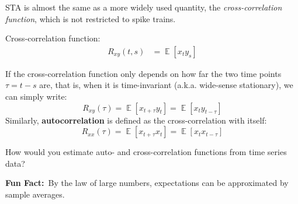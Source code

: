 \documentclass[a4paper,11pt]{exam}
\DeclareMathOperator*{\E}{\mathbb{E}} %
\DeclareMathOperator*{\cov}{cov}
\newcommand{\funfact}{\textbf{Fun Fact:}~}
\begin{document}
\begin{questions}
\newpage
STA is almost the same as a more widely used quantity, the \emph{cross-correlation function}, which is not restricted to spike trains.
\begin{tcolorbox}[colback=red!5!white,colframe=red!50!black]
    Cross-correlation function:
\begin{align}
    R_{xy}(t,s) &= \E[x_{t}y_s]
\end{align}
\end{tcolorbox}
If the cross-correlation function only depends on how far the two time points $\tau = t-s$ are, that is, when it is time-invariant (a.k.a. wide-sense stationary), we can simply write:
\begin{equation}
    R_{xy}(\tau) = \E[x_{t+\tau}y_t] = \E[x_t y_{t-\tau}]
\end{equation}
Similarly, \textbf{autocorrelation} is defined as the cross-correlation with itself:
\begin{equation}
    R_{xx}(\tau) = \E[x_{t+\tau}x_t] = \E[x_t x_{t-\tau}]
\end{equation}

\question How would you estimate auto- and cross-correlation functions from time series data?
\begin{tcolorbox}
    \funfact By the law of large numbers, expectations can be approximated by sample averages.
\end{tcolorbox}
\end{questions}
\end{document}
